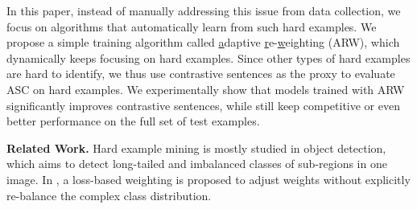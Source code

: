 In this paper, instead of manually addressing this issue from data collection, we focus on algorithms that automatically learn from such hard examples. 
We propose a simple training algorithm called \underline{a}daptive \underline{r}e-\underline{w}eighting (ARW), which dynamically keeps focusing on hard examples.
Since other types of hard examples are hard to identify, we thus use contrastive sentences as the proxy to evaluate ASC on hard examples.
We experimentally show that models trained with ARW significantly improves contrastive sentences, while still keep competitive or even better performance on the full set of test examples.

\noindent\textbf{Related Work.}
Hard example mining is mostly studied in object detection\cite{shrivastava2016training,lin2017focal}, which aims to detect long-tailed and imbalanced classes of sub-regions in one image.
In \cite{lin2017focal}, a loss-based weighting is proposed to adjust weights without explicitly re-balance the complex class distribution. 

